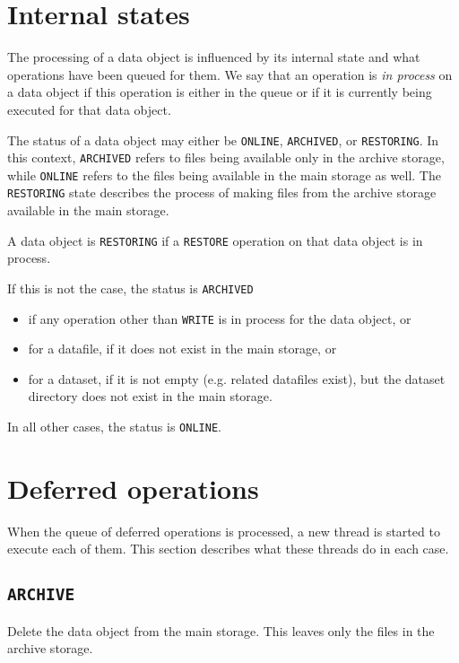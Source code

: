 \documentclass[paper=a4]{scrartcl}
\begin{document}
\section{Internal states}
\label{sec:states}

The processing of a data object is influenced by its internal state
and what operations have been queued for them. We say that an
operation is \emph{in process} on a data object if this operation is
either in the queue or if it is currently being executed for that
data object.

The status of a data object may either be \texttt{ONLINE},
\texttt{ARCHIVED}, or \texttt{RESTORING}. In this context,
\texttt{ARCHIVED} refers to files being available only in the archive
storage, while \texttt{ONLINE} refers to the files being available in
the main storage as well. The \texttt{RESTORING} state describes the
process of making files from the archive storage available in the
main storage.

A data object is \texttt{RESTORING} if a \texttt{RESTORE}
operation on that data object is in process.

If this is not the case, the status is \texttt{ARCHIVED}
\begin{itemize}[noitemsep,topsep=0pt]
\item if any operation other than \texttt{WRITE} is in process
for the data object, or
\item for a datafile, if it does not exist in the main storage, or
\item for a dataset, if it is not empty (e.g. related datafiles
exist), but the dataset directory does not exist in the main storage.
\end{itemize}

In all other cases, the status is \texttt{ONLINE}.


\section{Deferred operations}
\label{sec:defops}

When the queue of deferred operations is processed, a new thread is
started to execute each of them. This section describes what these
threads do in each case.

\subsection{\texttt{ARCHIVE}}
\label{sec:defops:archive}

Delete the data object from the main storage. This leaves only the
files in the archive storage.
\end{document}
